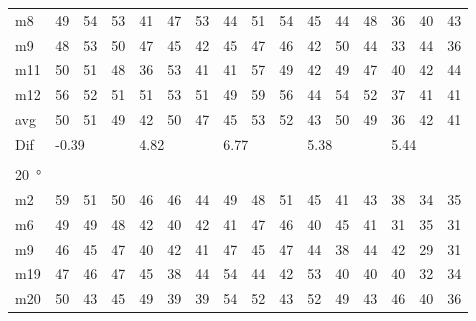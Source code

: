 \begin{table}[H]
\begin{tabular}{l|l|l|l|l|l|l|l|l|l|l|l|l|lll}
m8    & 49     &  54    & 53     & 41     &  47    & 53     & 44     & 51      &    54  &    45   &   44   &   48   & \multicolumn{1}{l|}{36} & \multicolumn{1}{l|}{40} & 43 \\ 
m9    &  48    & 53     &  50    & 47     &   45   &  42    & 45     &  47     &   46   &     42  &    50  &   44   & \multicolumn{1}{l|}{33} & \multicolumn{1}{l|}{44} & 36 \\ 
m11  &  50    & 51     &  48    &  36    &   53   &  41    & 41     &   57    &    49  &     42  &    49  &    47  & \multicolumn{1}{l|}{40} & \multicolumn{1}{l|}{42} & 44 \\ 
m12  &  56    & 52     &  51    &  51    &  53    & 51     & 49     &   59    &    56  &    44   &    54  &  52    & \multicolumn{1}{l|}{37} & \multicolumn{1}{l|}{41} & 41 \\ \hline
avg &  50    & 51     &  49    &   42   &  50    & 47     &  45    &  53     & 52     &   43    &  50    &  49    & \multicolumn{1}{l|}{36} & \multicolumn{1}{l|}{42}  & 41  \\ \hline  
Dif & \multicolumn{3}{l|}{-0.39} & \multicolumn{3}{l|}{4.82} & \multicolumn{3}{l|}{6.77} & \multicolumn{3}{l|}{5.38} & \multicolumn{3}{l}{5.44}  \\ 
 \multicolumn{16}{l}{ } \\                             
\SI{20}{\degree}   & \multicolumn{3}{l|}{} & \multicolumn{3}{l|}{} & \multicolumn{3}{l|}{} & \multicolumn{3}{l|}{} & \multicolumn{3}{l}{}   \\  \hline
m2    & 59     &  51    &  50    &  46    &  46    &  44    &  49    &   48    &  51    &  45     &  41    &  43    & \multicolumn{1}{l|}{38} & \multicolumn{1}{l|}{34} & 35  \\
m6    & 49     &  49    &  48    & 42     &  40    &  42    &   41   &   47    &   46   &   40    &  45    &  41    & \multicolumn{1}{l|}{31} & \multicolumn{1}{l|}{35} & 31  \\
m9    &  46    &  45    & 47     &  40    &   42   &   41   &   47   &   45    &  47    &   44    &  38   &  44    & \multicolumn{1}{l|}{42} & \multicolumn{1}{l|}{29} & 31 \\
m19  &    47  &  46    &  47    &  45    &  38    &    44  &   54   &   44    &   42   &   53    &  40   &   40   & \multicolumn{1}{l|}{40} & \multicolumn{1}{l|}{32} & 34 \\
m20  & 50     &  43    &  45    &  49    &  39    &    39  &   54   &   52    &   43   &  52     &  49    &   43   & \multicolumn{1}{l|}{46} & \multicolumn{1}{l|}{40} &  36\\ \hline

\end{tabular}
\end{table}

